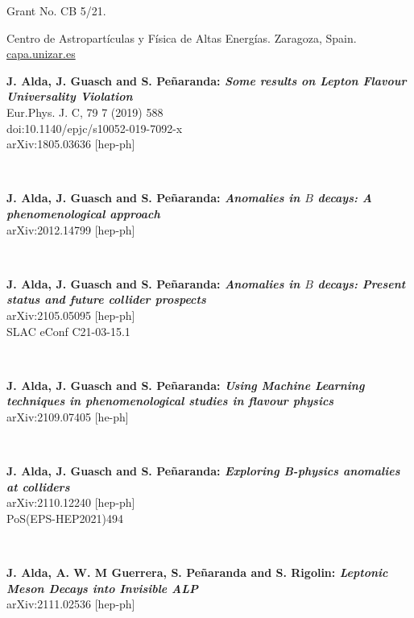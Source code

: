 \documentclass{cvf}
\begin{document}

Grant No. CB 5/21.

Centro de Astropartículas y Física de Altas Energías. Zaragoza, Spain.\\
\url{capa.unizar.es}



\hspace{\parindent}
\textbf{J. Alda, J. Guasch and S. Peñaranda: \textit{Some results on Lepton Flavour Universality Violation}}\\
Eur.Phys. J. C, 79 7 (2019) 588\\
doi:10.1140/epjc/s10052-019-7092-x\\
arXiv:1805.03636 [hep-ph]

~

\textbf{J. Alda, J. Guasch and S. Peñaranda: \textit{Anomalies in $B$ decays: A phenomenological approach}}\\
arXiv:2012.14799 [hep-ph]

~

\textbf{J. Alda, J. Guasch and S. Peñaranda: \textit{Anomalies in $B$ decays: Present status and future collider prospects}}\\
arXiv:2105.05095 [hep-ph]\\
SLAC eConf C21-03-15.1

~

\textbf{J. Alda, J. Guasch and S. Peñaranda: \textit{Using Machine Learning techniques in phenomenological studies in flavour physics}}\\
arXiv:2109.07405 [he-ph]

~

\textbf{J. Alda, J. Guasch and S. Peñaranda: \textit{Exploring B-physics anomalies at colliders}}\\
arXiv:2110.12240 [hep-ph]\\
PoS(EPS-HEP2021)494

~

\textbf{J. Alda, A. W. M Guerrera, S. Peñaranda and S. Rigolin: \textit{Leptonic Meson Decays into Invisible ALP}}\\
arXiv:2111.02536 [hep-ph]

\end{document}
